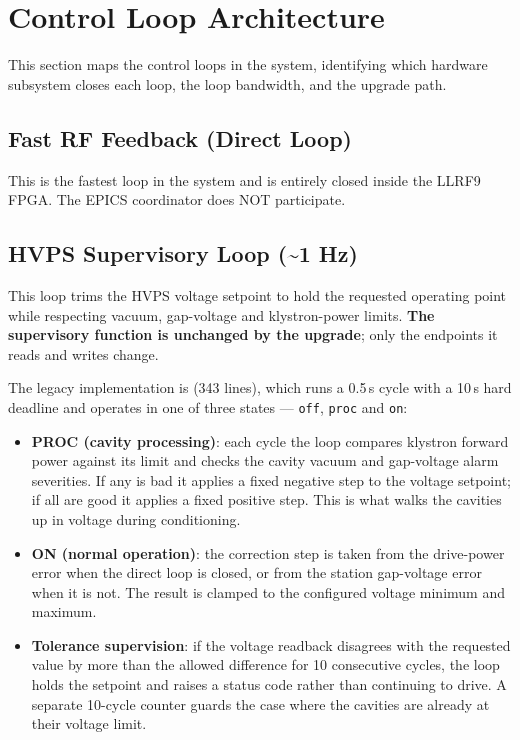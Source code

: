 \section{Control Loop Architecture}\label{control-loop-architecture}

This section maps the control loops in the system, identifying which hardware subsystem closes each loop, the loop bandwidth, and the upgrade path.

\subsection{Fast RF Feedback (Direct Loop)}\label{fast-rf-feedback-direct-loop}

This is the fastest loop in the system and is entirely closed inside the LLRF9 FPGA. The EPICS coordinator does NOT participate.

\subsection{HVPS Supervisory Loop (\textasciitilde1 Hz)}\label{hvps-supervisory-loop-1-hz}

This loop trims the HVPS voltage setpoint to hold the requested operating point while respecting vacuum, gap-voltage and klystron-power limits. \textbf{The supervisory function is unchanged by the upgrade}; only the endpoints it reads and writes change.

The legacy implementation is  (343 lines), which runs a 0.5\,s cycle with a 10\,s hard deadline and operates in one of three states --- \texttt{off}, \texttt{proc} and \texttt{on}:

\begin{itemize}
\tightlist
\item
  \textbf{PROC (cavity processing)}: each cycle the loop compares klystron forward power against its limit and checks the cavity vacuum and gap-voltage alarm severities. If any is bad it applies a fixed negative step to the voltage setpoint; if all are good it applies a fixed positive step. This is what walks the cavities up in voltage during conditioning.
\item
  \textbf{ON (normal operation)}: the correction step is taken from the drive-power error when the direct loop is closed, or from the station gap-voltage error when it is not. The result is clamped to the configured voltage minimum and maximum.
\item
  \textbf{Tolerance supervision}: if the voltage readback disagrees with the requested value by more than the allowed difference for 10 consecutive cycles, the loop holds the setpoint and raises a status code rather than continuing to drive. A separate 10-cycle counter guards the case where the cavities are already at their voltage limit.
\end{itemize}

